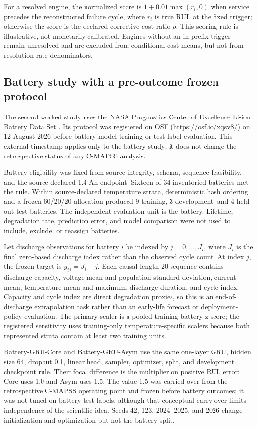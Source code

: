 \documentclass[preprint,12pt,numbers,sort&compress]{elsarticle}
\begin{document}
For a resolved engine, the normalized score is $1+0.01\max(r_i,0)$ when service precedes the reconstructed failure cycle, where $r_i$ is true RUL at the fixed trigger; otherwise the score is the declared corrective-cost ratio $\rho$. This scoring rule is illustrative, not monetarily calibrated. Engines without an in-prefix trigger remain unresolved and are excluded from conditional cost means, but not from resolution-rate denominators.

\subsection{Battery study with a pre-outcome frozen protocol}

The second worked study uses the NASA Prognostics Center of Excellence Li-ion Battery Data Set \citep{Saha2007BatteryData}. Its protocol was registered on OSF (\url{https://osf.io/xqsv8/}) on 12 August 2026 before battery-model training or test-label evaluation. This external timestamp applies only to the battery study; it does not change the retrospective status of any C-MAPSS analysis.

Battery eligibility was fixed from source integrity, schema, sequence feasibility, and the source-declared 1.4-Ah endpoint. Sixteen of 34 inventoried batteries met the rule. Within source-declared temperature strata, deterministic hash ordering and a frozen 60/20/20 allocation produced 9 training, 3 development, and 4 held-out test batteries. The independent evaluation unit is the battery. Lifetime, degradation rate, prediction error, and model comparison were not used to include, exclude, or reassign batteries.

Let discharge observations for battery $i$ be indexed by $j=0,\ldots,J_i$, where $J_i$ is the final zero-based discharge index rather than the observed cycle count. At index $j$, the frozen target is $y_{ij}=J_i-j$. Each causal length-20 sequence contains discharge capacity, voltage mean and population standard deviation, current mean, temperature mean and maximum, discharge duration, and cycle index. Capacity and cycle index are direct degradation proxies, so this is an end-of-discharge extrapolation task rather than an early-life forecast or deployment-policy evaluation. The primary scaler is a pooled training-battery z-score; the registered sensitivity uses training-only temperature-specific scalers because both represented strata contain at least two training units.

Battery-GRU-Core and Battery-GRU-Asym use the same one-layer GRU, hidden size 64, dropout 0.1, linear head, sampler, optimizer, split, and development checkpoint rule. Their focal difference is the multiplier on positive RUL error: Core uses 1.0 and Asym uses 1.5. The value 1.5 was carried over from the retrospective C-MAPSS operating point and frozen before battery outcomes; it was not tuned on battery test labels, although that conceptual carry-over limits independence of the scientific idea. Seeds 42, 123, 2024, 2025, and 2026 change initialization and optimization but not the battery split.
\end{document}
